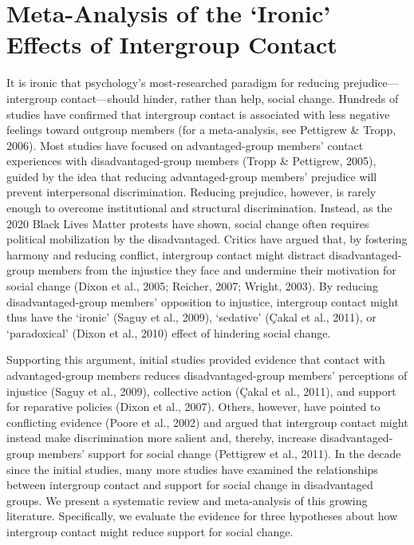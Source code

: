 \documentclass[12pt, letterpaper]{article}
\begin{document}
\newpage

\section{Meta-Analysis of the `Ironic' Effects of Intergroup Contact}

It is ironic that psychology's most-researched paradigm for reducing
prejudice---intergroup contact---should hinder, rather than help, social
change. Hundreds of studies have confirmed that intergroup contact is
associated with less negative feelings toward outgroup members (for a
meta-analysis, see Pettigrew \& Tropp, 2006). Most studies have focused
on advantaged-group members' contact experiences with
disadvantaged-group members (Tropp \& Pettigrew, 2005), guided by the
idea that reducing advantaged-group members' prejudice will prevent
interpersonal discrimination. Reducing prejudice, however, is rarely
enough to overcome institutional and structural discrimination. Instead,
as the 2020 Black Lives Matter protests have shown, social change often
requires political mobilization by the disadvantaged. Critics have
argued that, by fostering harmony and reducing conflict, intergroup
contact might distract disadvantaged-group members from the injustice
they face and undermine their motivation for social change (Dixon et
al., 2005; Reicher, 2007; Wright, 2003). By reducing disadvantaged-group
members' opposition to injustice, intergroup contact might thus have the
`ironic' (Saguy et al., 2009), `sedative' (Çakal et al., 2011), or
`paradoxical' (Dixon et al., 2010) effect of hindering social change.

Supporting this argument, initial studies provided evidence that contact
with advantaged-group members reduces disadvantaged-group members'
perceptions of injustice (Saguy et al., 2009), collective action (Çakal
et al., 2011), and support for reparative policies (Dixon et al., 2007).
Others, however, have pointed to conflicting evidence (Poore et al.,
2002) and argued that intergroup contact might instead make
discrimination more salient and, thereby, increase disadvantaged-group
members' support for social change (Pettigrew et al., 2011). In the
decade since the initial studies, many more studies have examined the
relationships between intergroup contact and support for social change
in disadvantaged groups. We present a systematic review and
meta-analysis of this growing literature. Specifically, we evaluate the
evidence for three hypotheses about how intergroup contact might reduce
support for social change.
\end{document}
